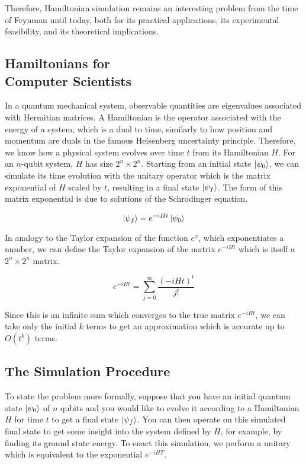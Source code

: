 Therefore, Hamiltonian simulation remains an interesting problem from the
time of Feynman until today, both for its practical applications, its
experimental feasibility, and its theoretical implications.

\subsection{Hamiltonians for \\ Computer Scientists}

In a quantum mechanical system, observable quantities are eigenvalues
associated with Hermitian matrices. A Hamiltonian is the operator associated
with the energy of a system, which is a dual to time, similarly to how
position and momentum are duals in the famous Heisenberg uncertainty principle.
Therefore, we know
how a physical system evolves over time $t$ from its Hamiltonian $H$. For
an $n$-qubit system, $H$ has size $2^n \times 2^n$.
Starting from an initial state $\left\vert{\psi_0}\right\rangle$, we can simulate its time
evolution with the unitary operator which is the
matrix exponential of $H$ scaled by $t$, resulting in a final state $\left\vert{\psi_f}\right\rangle$.
The form of this matrix exponential is due to solutions of the Schrodinger
equation.

\begin{equation}
\left\vert{\psi_f}\right\rangle = e^{-iHt} \left\vert{\psi_0}\right\rangle
\end{equation}

In analogy to 
the Taylor expansion of the function $e^x$, which exponentiates a number,
we can define the Taylor expansion of the matrix $e^{-iHt}$ which is itself
a $2^n\times 2^n$ matrix.

\begin{equation}
e^{-iHt} = \sum_{j=0}^{\infty} \frac{(-iHt)^t}{j!}
\end{equation}

Since this is an infinite sum which converges to the true matrix
$e^{-iHt}$, we can take only the initial $k$ terms to get an approximation
which is accurate up to $O(t^k)$ terms.

\subsection{The Simulation Procedure}

To state the problem more formally, suppose that you have an initial
quantum state $\left\vert{\psi_0}\right\rangle$ of $n$ qubits
and you would like to evolve it according to a Hamiltonian $H$ for time
$t$ to get
a final state $\left\vert{\psi_f}\right\rangle$. You can then operate on this simulated final state
to get some insight into the system defined by $H$, for example, by finding
its ground state energy.
To
enact this simulation, we perform a unitary which is equivalent to the
exponential $e^{-iHT}$.

